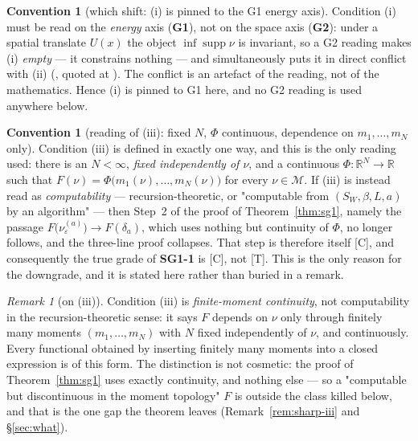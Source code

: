 \documentclass[11pt]{article}
\theoremstyle{definition}
\newtheorem{convention}[theorem]{Convention}
\theoremstyle{remark}
\newtheorem{remark}[theorem]{Remark}
\newcommand{\code}[1]{\texttt{\footnotesize\detokenize{#1}}}
\newcommand{\grT}{\textsf{[T]}}
\newcommand{\grC}{\textsf{[C]}}
\begin{document}
\begin{convention}[which shift: (i) is pinned to the G1 energy axis]\label{conv:G1}
Condition (i) must be read on the \emph{energy} axis (\textbf{G1}), not on the
space axis (\textbf{G2}): under a spatial translate $U(x)$ the object
$\inf\operatorname{supp}\nu$ is invariant, so a G2 reading makes (i)
\emph{empty} --- it constrains nothing --- and simultaneously puts it in direct
conflict with (ii) (\code{B05-DUAL.md:76--83}, quoted at \code{NS2.md:18}).
The conflict is an artefact of the reading, not of the mathematics. Hence (i)
is pinned to G1 here, and no G2 reading is used anywhere below.
\end{convention}

\begin{convention}[reading of (iii): fixed $N$, $\Phi$ continuous, dependence on $m_1,\dots,m_N$ only]\label{conv:iii-strict}
Condition (iii) is defined in exactly one way, and this is the only reading
used: there is an $N<\infty$, \emph{fixed independently of $\nu$}, and a
continuous $\Phi:\mathbb R^{N}\to\mathbb R$ such that
$F(\nu)=\Phi\bigl(m_1(\nu),\dots,m_N(\nu)\bigr)$ for every $\nu\in\mathcal M$.
If (iii) is instead read as \emph{computability} --- recursion-theoretic, or
"computable from $(S_W,\beta,L,a)$ by an algorithm" --- then Step~2 of the
proof of Theorem~\ref{thm:sg1}, namely the passage
$F\bigl(\nu_\varepsilon^{(a)}\bigr)\to F(\delta_a)$, which uses nothing but
continuity of $\Phi$, no longer follows, and the three-line proof collapses.
That step is therefore itself \grC{}, and consequently the true grade of
\textbf{SG1-1} is \grC{}, not \grT. This is the only reason for the
downgrade, and it is stated here rather than buried in a remark.
\end{convention}

\begin{remark}[on (iii)]\label{rem:iii}
Condition (iii) is \emph{finite-moment continuity}, not computability in the
recursion-theoretic sense: it says $F$ depends on $\nu$ only through finitely
many moments $(m_1,\dots,m_N)$ with $N$ fixed independently of $\nu$, and
continuously. Every functional obtained by inserting finitely many moments into
a closed expression is of this form. The distinction is not cosmetic: the
proof of Theorem~\ref{thm:sg1} uses exactly continuity, and nothing else ---
so a "computable but discontinuous in the moment topology" $F$ is outside the
class killed below, and that is the one gap the theorem leaves
(Remark~\ref{rem:sharp-iii} and \S\ref{sec:what}).
\end{remark}
\end{document}
